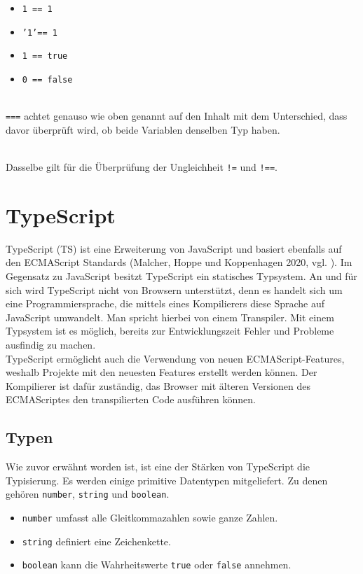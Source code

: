 \begin{itemize}
	\item \texttt{1 == 1}
	\item \texttt{'1'== 1}
	\item \texttt{1 == true}
	\item \texttt{0 == false}
\end{itemize}

\mbox{}\\
\texttt{===} achtet genauso wie oben genannt auf den Inhalt mit dem Unterschied, dass davor überprüft wird, ob beide Variablen denselben Typ haben.

\mbox{}\\
Dasselbe gilt für die Überprüfung der Ungleichheit \texttt{!=} und \texttt{!==}.

\section{TypeScript}
TypeScript (TS) ist eine Erweiterung von JavaScript und basiert ebenfalls auf den ECMAScript Standards (Malcher, Hoppe und Koppenhagen 2020, vgl. \cite{typescript_2020}). Im Gegensatz zu JavaScript besitzt TypeScript ein statisches Typsystem. An und für sich wird TypeScript nicht von Browsern unterstützt, denn es handelt sich um eine Programmiersprache, die mittels eines Kompilierers diese Sprache auf JavaScript umwandelt. Man spricht hierbei von einem Transpiler. Mit einem Typsystem ist es möglich, bereits zur Entwicklungszeit Fehler und Probleme ausfindig zu machen.\\
TypeScript ermöglicht auch die Verwendung von neuen ECMAScript-Features, weshalb Projekte mit den neuesten Features erstellt werden können. Der Kompilierer ist dafür zuständig, das Browser mit älteren Versionen des ECMAScriptes den transpilierten Code ausführen können.

\newpage
\subsection{Typen}
Wie zuvor erwähnt worden ist, ist eine der Stärken von TypeScript die Typisierung. Es werden einige primitive Datentypen mitgeliefert. Zu denen gehören \texttt{number}, \texttt{string} und \texttt{boolean}.

\begin{itemize}
	\item \texttt{number} umfasst alle Gleitkommazahlen sowie ganze Zahlen.
	\item \texttt{string} definiert eine Zeichenkette.
	\item \texttt{boolean} kann die Wahrheitswerte \texttt{true} oder \texttt{false} annehmen.
\end{itemize}

